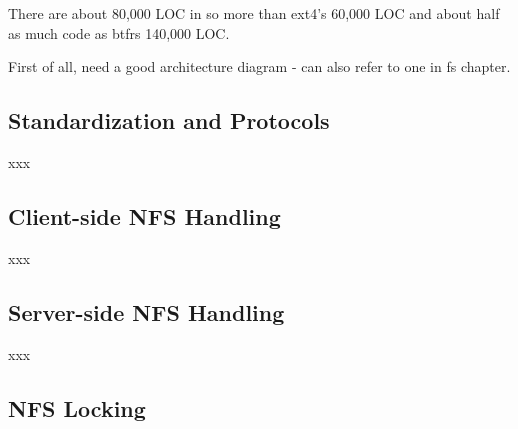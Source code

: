 
There are about 80,000 LOC in  so more than ext4's 60,000 LOC and about half as much code as btfrs 140,000 LOC.

First of all, need a good architecture diagram - can also refer to one in fs chapter.


\subsection{Standardization and Protocols}

xxx


\subsection{Client-side NFS Handling}

xxx


\subsection{Server-side NFS Handling}

xxx


\subsection{NFS Locking}

